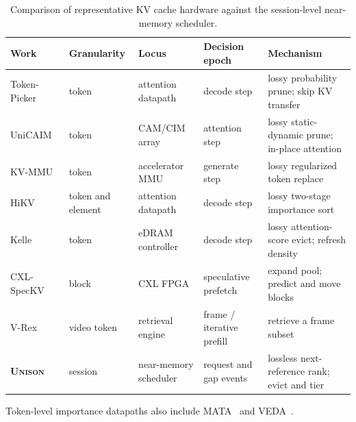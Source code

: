 \begin{table}[t]
\centering
\renewcommand{\arraystretch}{1.12}
\setlength{\tabcolsep}{2pt}
\scriptsize
\begin{threeparttable}
\caption{Comparison of representative KV cache hardware against the
session-level near-memory scheduler.}
\label{tab:hw-kv}
\begin{tabular*}{\textwidth}{@{\extracolsep{\fill}}lllll@{}}
\toprule
\textbf{Work} & \textbf{Granularity} & \textbf{Locus} &
\textbf{Decision epoch} & \textbf{Mechanism} \\
\midrule
Token-Picker~\cite{park_tokenpicker_2024} & token & attention datapath
  & decode step & lossy probability prune; skip KV transfer \\
UniCAIM~\cite{xu_unicaim_2025} & token & CAM/CIM array
  & attention step & lossy static-dynamic prune; in-place attention \\
KV-MMU~\cite{moradifirouzabadi_kvmmu_2025} & token & accelerator MMU
  & generate step & lossy regularized token replace \\
HiKV~\cite{fang_hikv_2026} & token and element & attention datapath
  & decode step & lossy two-stage importance sort \\
Kelle~\cite{xia_kelle_2025} & token & eDRAM controller
  & decode step & lossy attention-score evict; refresh density \\
CXL-SpecKV~\cite{liu_cxlspeckv_2026} & block & CXL FPGA
  & speculative prefetch & expand pool; predict and move blocks \\
V-Rex~\cite{kim_vrex_2026} & video token & retrieval engine
  & frame / iterative prefill & retrieve a frame subset \\
\rowcolor{gray!10}
\textbf{\textsc{Unison}} & session & near-memory scheduler
  & request and gap events & lossless next-reference rank; evict and tier \\
\bottomrule
\end{tabular*}
\begin{tablenotes}\scriptsize
\item[a] Token-level importance datapaths also include
MATA~\cite{zhu_mata_2026} and VEDA~\cite{wang_veda_2025}.
\end{tablenotes}
\end{threeparttable}
\end{table}

